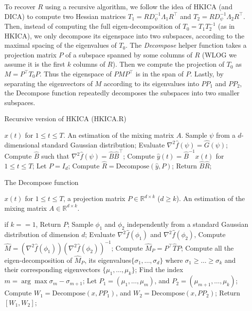 \documentclass[11pt]{article}
\newcommand{\real}{\mathbb{R}}
\begin{document}
To recover $R$ using a recursive algorithm, we follow the idea of HKICA (and DICA) to compute two Hessian matrices $T_1 = RD_{\psi}^{-1}\Lambda_1R^{\top}$ and $T_2 = RD_{\psi}^{-1}\Lambda_2R^{\top}$. 
Then, instead of computing the full eigen-decomposition of $T_0=T_1 T_2^{-1}$ (as in HKICA), we only decompose its eigenspace into two subspaces, according to the maximal spacing of the eigenvalues of $T_0$. The \emph{Decompose} helper function takes a projection matrix $P$ of a subspace spanned
by some columns of $R$ (WLOG we assume it is the first $k$ columns of $R$). Then we compute the projection of $T_0$ as $M = P^{\top}T_0P$. Thus the eigenspace of $PMP^{\top}$ is in the span of $P$. 
Lastly, by separating the eigenvectors of $M$ according to its eigenvalues into $PP_1$ and $PP_2$, the Decompose function repeatedly decomposes the subspaces into two smaller subspaces.  
\begin{algorithm} 
	\caption{Recursive version of HKICA (HKICA.R)}
	\label{alg:HKICA_recur}
	\begin{algorithmic}[1]
		\INPUT $x(t)$ for $1\le t \le T$. 
		\OUTPUT An estimation of the mixing matrix $A$. 
		\STATE Sample $\psi$ from a $d$-dimensional standard Gaussian distribution;
		\STATE Evaluate $\nabla^2\hat{f}(\psi) = \hat{G}(\psi)$; \\
		\STATE Compute $\hat{B}$ such that $\nabla^2\hat{f}(\psi) = \hat{B}\hat{B}^{\top}$;
		\STATE Compute $\hat{y}(t) = \hat{B}^{-1}x(t)$ for $1\le t \le T$;
		\STATE Let $P = I_d$;
		\STATE Compute $\hat{R} = \text{Decompose}(\hat{y}, P)$;
		\STATE Return $\hat{B}\hat{R}$;
	\end{algorithmic}
\end{algorithm}
\begin{algorithm} 
	\caption{The Decompose function}
	\label{alg:recur}
	\begin{algorithmic}[1]
		\INPUT $x(t)$ for $1\le t \le T$, a projection matrix $P\in \real^{d\times k}$ ($d\ge k$). 
		\OUTPUT An estimation of the mixing matrix $A\in \real^{d\times k}$. 
		
		\STATE if $k==1$, Return $P$;
		\STATE Sample $\phi_1$ and $\phi_2$ independently from a standard Gaussian distribution of dimension $d$;
		\STATE Evaluate $\nabla^2\hat{f}(\phi_1)$ and $\nabla^2\hat{f}(\phi_2)$, 
		\STATE Compute $\hat{M} = (\nabla^2 \hat{f}(\phi_1))(\nabla^2\hat{f}(\phi_2))^{-1}$;
		\STATE Compute $\hat{M}_P = P^{\top} \hat{T} P$;
		\STATE Compute all the eigen-decomposition of $\hat{M}_P$, its eigenvalues$\{\sigma_1,\ldots,\sigma_d\}$ where $\sigma_1\ge\ldots\ge \sigma_k$ and their corresponding eigenvectors $\{\mu_1,\ldots, \mu_k\}$;
		\STATE Find the index $m = \arg\max \sigma_m - \sigma_{m+1}$; 
		\STATE Let $P_1 = (\mu_1,\ldots,\mu_m)$, and $P_2 = (\mu_{m+1},\ldots,\mu_k)$;
		\STATE Compute $W_1 = \text{Decompose} (x, PP_1)$, and  $W_2 = \text{Decompose} (x, PP_2)$;
		\STATE Return $[W_1,W_2]$;
	\end{algorithmic}
\end{algorithm}
\end{document}
